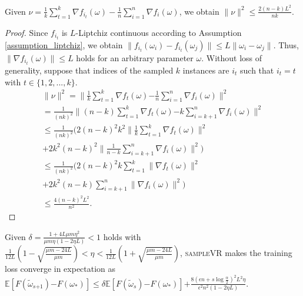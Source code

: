\documentclass[letterpaper]{article}
\begin{document}
\begin{Lemma}
\label{lemma_nu}
Given $\nu = \frac{1}{k}\sum\limits_{t=1}^k  \nabla f_{i_t}(\omega) - \frac{1}{n}\sum\limits_{i=1}^n \nabla f_i(\omega)$, we obtain
$\parallel \nu  \parallel^2 \le \frac{2(n-k)L^2}{nk}$.
\end{Lemma}
\begin{proof}
Since $f_{i_t}$ is $L$-Liptchiz continuous according to Assumption \ref{assumption_liptchiz},  we obtain $\parallel  f_{i_t}(\omega_i) - f_{i_t}(\omega_j)  \parallel \le L \parallel \omega_i - \omega_j    \parallel$. Thus, $\parallel \nabla f_{i_t}(\omega) \parallel \le L$ holds for an arbitrary parameter $\omega$.
Without loss of generality, suppose that indices of the sampled $k$ instances are $i_t$ such that $i_t\mathrm{=}t$ with $t\mathrm{\in}\{1,2, ..., k\}$.
\begin{equation}
\begin{array}{ll}
\parallel \nu  \parallel^2 
=\parallel \frac{1}{k}\sum\limits_{t=1}^k  \nabla f_{t}(\omega) \mathrm{-} \frac{1}{n}\sum\limits_{i=1}^n \nabla f_i(\omega) \parallel^2    \\
=\frac{1}{(nk)^2}\parallel (n-k)\sum\limits_{t=1}^k  \nabla f_{t}(\omega) \mathrm{-} k\sum\limits_{i=k+1}^n \nabla f_i(\omega) \parallel^2\\
\le \frac{1}{(nk)^2} ( 2(n-k)^2 k^2 \parallel \frac{1}{k} \sum\limits_{t=1}^k \nabla f_{t}(\omega)\parallel^2 \\
+2k^2 (n-k)^2 \parallel \frac{1}{n-k}\sum\limits_{i=k+1}^n \nabla f_{i}(\omega) \parallel^2 )     \\
\le \frac{1}{(nk)^2} ( 2(n-k)^2 k \sum\limits_{t=1}^k\parallel  \nabla f_{t}(\omega)\parallel^2 \\
+2k^2 (n-k) \sum\limits_{i=k+1}^n \parallel  \nabla f_{i}(\omega) \parallel^2 )     \\
\le \frac{4(n-k)^2L^2}{n^2}.
\end{array} 
\end{equation}
\end{proof}
\begin{Theorem}
\label{Theorem_converge}
Given $\delta=\frac{1+4L\mu m \eta^2}{  \mu m \eta (1-2\eta L)  } \mathrm{<} 1$ holds with $\frac{1}{12L}\left( 1- \sqrt{\frac{\mu m - 24L}{\mu m}} \right) \mathrm{<} \eta \mathrm{<} \frac{1}{12L}\left( 1+ \sqrt{\frac{\mu m - 24L}{\mu m}} \right)$, \textsc{sampleVR} makes the training loss converge in expectation as
$\mathbb{E}[F(\tilde{\omega}_{s\mathrm{+}1}) \mathrm{-} F(\omega_\ast)]  \mathrm{\le} \delta \mathbb{E}[F(\tilde{\omega}_s)\mathrm{-}F(\omega_\ast)] \mathrm{+} \frac{8(\epsilon n+s\log\frac{\alpha}{2})^2L^2\eta}{\epsilon^2n^2(1-2\eta L)}$.
\end{Theorem}
\end{document}

